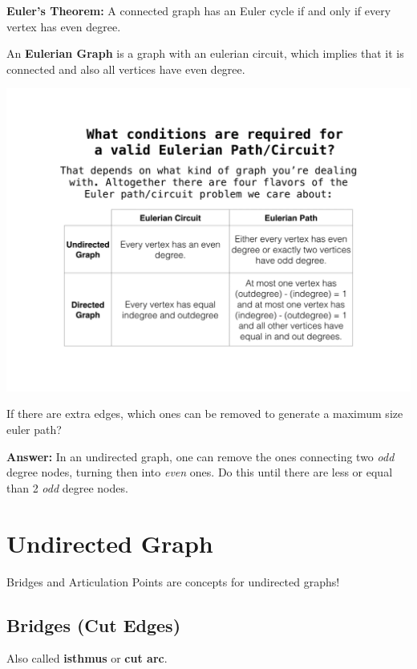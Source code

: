 	\textbf{Euler's Theorem:} A connected graph has an Euler cycle if and only if every vertex has even degree.

	An \textbf{Eulerian Graph} is a graph with an eulerian circuit, which implies that it is connected and 
	also all vertices have even degree.

	\begin{center}
	\includegraphics[scale=.1, keepaspectratio]{content/graph/Eulerian-Path-Existence.png}
	\end{center}

	If there are extra edges, which ones can be removed to generate a maximum size euler path?

	\textbf{Answer:} In an undirected graph, one can remove the ones connecting two \textit{odd} degree 
	nodes, turning then into \textit{even} ones. Do this until there are less or equal than 2 \textit{odd} degree nodes. 


\section{Undirected Graph}

	Bridges and Articulation Points are concepts for undirected graphs!
	
	\subsection{Bridges (Cut Edges)}

		Also called \textbf{isthmus} or \textbf{cut arc}.
		
